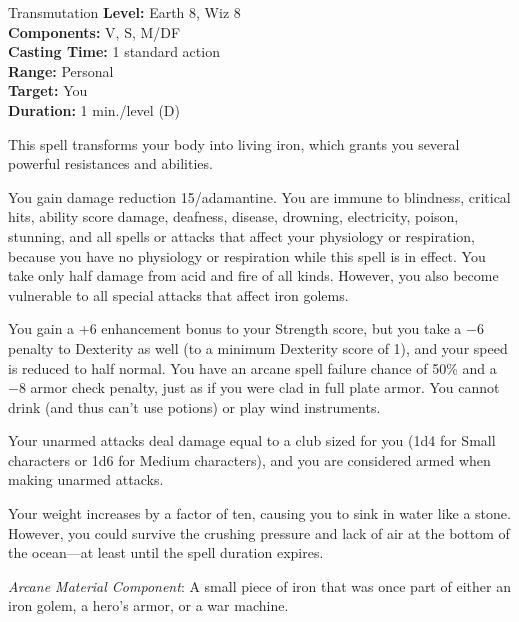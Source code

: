 {Transmutation}
{
	\textbf{Level:}
	Earth 8, Wiz 8\\
	\textbf{Components:}
	V, S, M/DF\\
	\textbf{Casting Time:}
	1 standard action\\
	\textbf{Range:}
	Personal\\
	\textbf{Target:}
	You\\
	\textbf{Duration:}
	1 min./level (D)\\
}
{
	This spell transforms your body into living iron, which grants you several powerful resistances and abilities.

	You gain damage reduction 15/adamantine. You are immune to blindness, critical hits, ability score damage, deafness, disease, drowning, electricity, poison, stunning, and all spells or attacks that affect your physiology or respiration, because you have no physiology or respiration while this spell is in effect. You take only half damage from acid and fire of all kinds. However, you also become vulnerable to all special attacks that affect iron golems.

	You gain a +6 enhancement bonus to your Strength score, but you take a $-6$ penalty to Dexterity as well (to a minimum Dexterity score of 1), and your speed is reduced to half normal. You have an arcane spell failure chance of 50\% and a $-8$ armor check penalty, just as if you were clad in full plate armor. You cannot drink (and thus can't use potions) or play wind instruments.

	Your unarmed attacks deal damage equal to a club sized for you (1d4 for Small characters or 1d6 for Medium characters), and you are considered armed when making unarmed attacks.

	Your weight increases by a factor of ten, causing you to sink in water like a stone. However, you could survive the crushing pressure and lack of air at the bottom of the ocean---at least until the spell duration expires.

	\textit{Arcane Material Component}:
	A small piece of iron that was once part of either an iron golem, a hero's armor, or a war machine.

}
